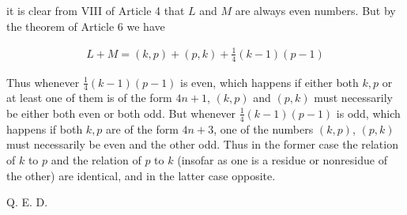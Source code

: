 it is clear from VIII of Article 4 that $L$ and $M$ are always even numbers. But by the theorem of Article 6 we have

\[
\begin{aligned}
L+M=(k,p)+(p,k)+\tfrac14(k-1)(p-1)
\end{aligned}
\]

Thus whenever $\frac14(k-1)(p-1)$ is even, which happens if either both $k,p$ or at least one of them is of the form $4n+1$, $(k,p)$ and $(p,k)$ must necessarily be either both even or both odd. But whenever $\frac14(k-1)(p-1)$ is odd, which happens if both $k,p$ are of the form $4n+3$, one of the numbers $(k,p)$, $(p,k)$ must necessarily be even and the other odd. Thus in the former case the relation of $k$ to $p$ and the relation of $p$ to $k$ (insofar as one is a residue or nonresidue of the other) are identical, and in the latter case opposite.

Q. E. D.

\BookRule{35mm}
